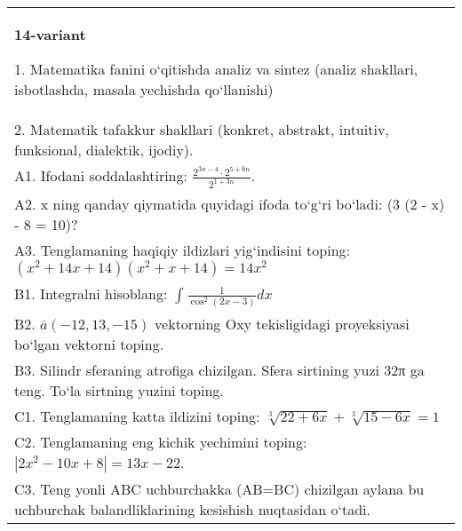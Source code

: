 \documentclass{article}
\begin{document}
\begin{tabular}{m{17cm}}
\textbf{14-variant}

1. Matematika fanini o‘qitishda analiz va sintez (analiz shakllari, isbotlashda, masala yechishda qo‘llanishi) \\
2. Matematik tafakkur shakllari (konkret, abstrakt, intuitiv, funksional, dialektik, ijodiy). \\
A1. Ifodani soddalashtiring: \(\frac{2^{3n - 4} \cdot 2^{5 + 6n}}{2^{1 + 3n}}\). \\
A2. x ning qanday qiymatida quyidagi ifoda to‘g‘ri bo‘ladi: (3 (2 - x) - 8 = 10)? \\
A3. Tenglamaning haqiqiy ildizlari yig‘indisini toping: \((x^2 + 14x + 14) (x^2 + x + 14) = 14x^2\) \\
B1. Integralni hisoblang: \(\int_{}^{}{\frac{1}{\cos^{2} (2x - 3) }dx}\) \\
B2. \(\overline{a} (- 12,13, - 15) \) vektorning Oxy tekisligidagi proyeksiyasi bo‘lgan vektorni toping. \\
B3. Silindr sferaning atrofiga chizilgan. Sfera sirtining yuzi 32π ga teng. To‘la sirtning yuzini toping. \\
C1. Tenglamaning katta ildizini toping: \(\sqrt[3]{22 + 6x} + \sqrt[3]{15 - 6x} = 1\) \\
C2. Tenglamaning eng kichik yechimini toping: \(\left| 2x^2 - 10x + 8 \right| = 13x - 22\). \\
C3. Teng yonli ABC uchburchakka (AB=BC) chizilgan aylana bu uchburchak balandliklarining kesishish nuqtasidan o‘tadi. \\

\end{tabular}
\vspace{1cm}
\end{document}
